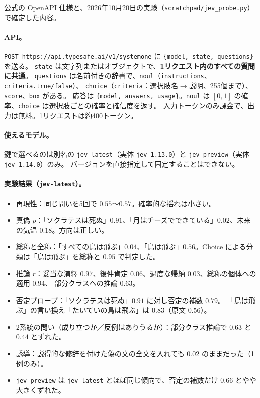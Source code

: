 \documentclass[a4paper,11pt]{ltjsarticle}
\begin{document}
公式の OpenAPI 仕様と、2026年10月20日の実験（\texttt{scratchpad/jev\_probe.py}）で確定した内容。

\paragraph{API。}
\texttt{POST https://api.typesafe.ai/v1/systemone} に \texttt{\{model, state, questions\}} を送る。
\texttt{state} は文字列またはオブジェクトで、\textbf{1リクエスト内のすべての質問に共通}。
\texttt{questions} は名前付きの辞書で、\texttt{noul}（\texttt{instructions}、\texttt{criteria.true/false}）、
\texttt{choice}（\texttt{criteria}：選択肢名$\to$説明、255個まで）、\texttt{score}、\texttt{box} がある。
応答は \texttt{\{model, answers, usage\}}。\texttt{noul} は $[0,1]$ の確率、\texttt{choice} は選択肢ごとの確率と確信度を返す。
入力トークンのみ課金で、出力は無料。1リクエストは約400トークン。

\paragraph{使えるモデル。}
鍵で選べるのは別名の \texttt{jev-latest}（実体 \texttt{jev-1.13.0}）と \texttt{jev-preview}（実体 \texttt{jev-1.14.0}）のみ。
バージョンを直接指定して固定することはできない。

\paragraph{実験結果（\texttt{jev-latest}）。}
\begin{itemize}
  \item 再現性：同じ問いを5回で $0.55$〜$0.57$。確率的な揺れは小さい。
  \item 真偽 $p$：「ソクラテスは死ぬ」$0.91$、「月はチーズでできている」$0.02$、未来の気温 $0.18$。方向は正しい。
  \item 総称と全称：「すべての鳥は飛ぶ」$0.04$、「鳥は飛ぶ」$0.56$。Choice による分類は「鳥は飛ぶ」を総称と $0.95$ で判定した。
  \item 推論 $r$：妥当な演繹 $0.97$、後件肯定 $0.06$、過度な帰納 $0.03$、総称の個体への適用 $0.94$、
        部分クラスへの推論 $0.63$。
  \item 否定プローブ：「ソクラテスは死ぬ」$0.91$ に対し否定の補数 $0.79$。
        「鳥は飛ぶ」の言い換え「たいていの鳥は飛ぶ」は $0.83$（原文 $0.56$）。
  \item 2系統の問い（成り立つか／反例はありうるか）：部分クラス推論で $0.63$ と $0.44$ とずれた。
  \item 誘導：説得的な修辞を付けた偽の文の全文を入れても $0.02$ のままだった（1例のみ）。
  \item \texttt{jev-preview} は \texttt{jev-latest} とほぼ同じ傾向で、否定の補数だけ $0.66$ とやや大きくずれた。
\end{itemize}
\end{document}
